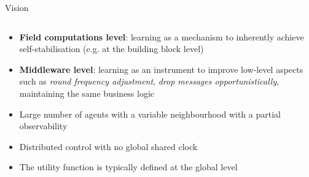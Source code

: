 \begin{frame}{\playfairblack Vision}
  \begin{columns}[onlytextwidth, t]
    \begin{column}{\textwidth}
      \begin{card}
        \begin{itemize}
          \item[\highlightAlt{\faStar}] \textbf{Field computations level}: learning as a mechanism to inherently achieve self-stabilisation (e.g. at the building block level)
          \item[\highlightAlt{\faStar}] \textbf{Middleware level}: learning as an instrument to improve low-level aspects such as \emph{round frequency adjustment}, \emph{drop messages opportunistically}, maintaining the same business logic
        \end{itemize}
      \end{card}
      \begin{card}[Settings]
        \begin{itemize}
          \item Large number of agents with a variable neighbourhood with a partial observability
          \item Distributed control with no global shared clock 
          \item The utility function is typically defined at the global level
        \end{itemize}
      \end{card}
    \end{column}
  \end{columns}
\end{frame}